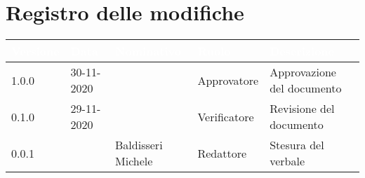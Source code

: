 \section*{Registro delle modifiche}
{
\setcounter{table}{-1}
{
\renewcommand{\arraystretch}{1.5}
\centering
\begin{longtable}{C{1.7cm} C{2.5cm} C{3.2cm} C{2.7cm} C{4.8cm}}
\textcolor{white}{\textbf{Versione}}&
\textcolor{white}{\textbf{Data}}&
\textcolor{white}{\textbf{Nominativo}}&
\textcolor{white}{\textbf{Ruolo}}&
\textcolor{white}{\textbf{Descrizione}}\\	
\endhead
		
1.0.0 & 30-11-2020 & \SG{} & Approvatore & Approvazione del documento\\

0.1.0 & 29-11-2020 & \PA{} & Verificatore & Revisione del documento\\

0.0.1 & \Data{} & Baldisseri Michele & Redattore & Stesura del verbale\\
		
\end{longtable}
}
}
